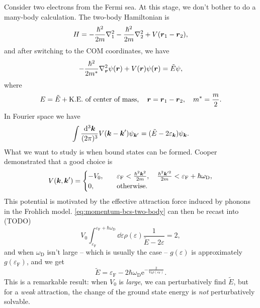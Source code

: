 \documentclass[hyperref, a4paper]{article}
\newcommand*{\ee}{\mathrm{e}}
\begin{document}
Consider two electrons from the Fermi sea.
At this stage, we don't bother to do a many-body calculation.
The two-body Hamiltonian is 
\begin{equation}
    H = - \frac{\hbar^2}{2m} \laplacian_1 - \frac{\hbar^2}{2m} \laplacian_2 
    + V(\vb*{r}_1 - \vb*{r}_2),
\end{equation}
and after switching to the COM coordinates, 
we have 
\begin{equation}
    - \frac{\hbar^2}{2m^*} \laplacian_{\vb*{r}} \psi(\vb*{r}) + V(\vb*{r}) \psi(\vb*{r}) = \tilde{E} \psi,
\end{equation}
where 
\begin{equation}
    E = \tilde{E} + \text{K.E. of center of mass}, \quad 
    \vb*{r} = \vb*{r}_1 - \vb*{r}_2, \quad
    m^* = \frac{m}{2}.
\end{equation}
In Fourier space we have
\begin{equation}
    \int \frac{\dd[3]{\vb*{k}}}{(2\pi)^3} V(\vb*{k} - \vb*{k}') \psi_{\vb*{k}'} = 
    (\tilde{E} - 2 \varepsilon_{\vb*{k}}) \psi_{\vb*{k}}.
    \label{eq:momentum-bcs-two-body}
\end{equation}
What we want to study is when bound states can be formed.
Cooper demonstrated that a good choice is 
\begin{equation}
    V(\vb*{k}, \vb*{k}') = \begin{cases}
        - V_0, &\quad
        \varepsilon_{\text{F}} < \frac{\hbar^2 \vb*{k}^2}{2m}, 
        \quad \frac{\hbar^2 \vb*{k}'^2}{2m} < \varepsilon_{\text{F}} + \hbar \omega_{\text{D}}, \\
        0, &\quad \text{otherwise}.
    \end{cases}
\end{equation}
This potential is motivated by the effective attraction force induced by phonons 
in the Frohlich model.
\eqref{eq:momentum-bcs-two-body}
can then be recast into (TODO)
\begin{equation}
    V_0 \int_{\varepsilon_{\text{F}}}^{\varepsilon_{\text{F}} + \hbar \omega_{\text{D}}}
    \dd{\varepsilon} \rho(\varepsilon) 
    \frac{1}{\tilde{E} - 2 \varepsilon} = 2,
\end{equation}
and when $\omega_{\text{D}}$ isn't large -- which is usually the case -- 
$g(\varepsilon)$ is approximately $g(\varepsilon_{\text{F}})$,
and we get 
\begin{equation}
    \tilde{E} = \varepsilon_{\text{F}} - 2 \hbar \omega_{\text{D}} \ee^{- \frac{2}{V_0 \rho(\varepsilon_{\text{F}})}}.
\end{equation}
This is a remarkable result: 
when $V_{0}$ is \emph{large}, 
we can perturbatively find $\tilde{E}$,
but for a \emph{weak} attraction,
the change of the ground state energy is \emph{not} 
perturbatively solvable.
\end{document}
